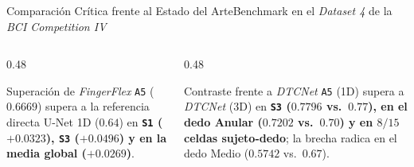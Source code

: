 \begin{frame}{Comparaci\'on Cr\'itica frente al Estado del Arte}{Benchmark en el \textit{Dataset 4} de la \textit{BCI Competition IV} \cite{liang2012decoding,Xie2018,Lomtev2022,wang2025dtcnet,rodas_valencia_tpe_ecog}}
  \vspace{1.5mm}
  \begin{columns}[T,onlytextwidth]
    \begin{column}{0.48\textwidth}
      \begin{block}{Superaci\'on de \textit{FingerFlex} \cite{Lomtev2022}}
        \scriptsize
        \texttt{A5} ($0.6669$) supera a la referencia directa U-Net 1D ($0.64$) en \textbf{\texttt{S1} ($+0.0323$), \texttt{S3} ($+0.0496$) y en la media global ($\mathbf{+0.0269}$)}.
      \end{block}
    \end{column}
    \begin{column}{0.48\textwidth}
      \begin{alertblock}{Contraste frente a \textit{DTCNet} \cite{wang2025dtcnet}}
        \scriptsize
        \texttt{A5} (1D) supera a \textit{DTCNet} (3D) en \textbf{\texttt{S3} ($0.7796$ vs.\ $0.77$), en el dedo Anular ($0.7202$ vs.\ $0.70$) y en $8/15$ celdas sujeto-dedo}; la brecha radica en el dedo Medio ($0.5742$ vs.\ $0.67$).
      \end{alertblock}
    \end{column}
  \end{columns}
\end{frame}
